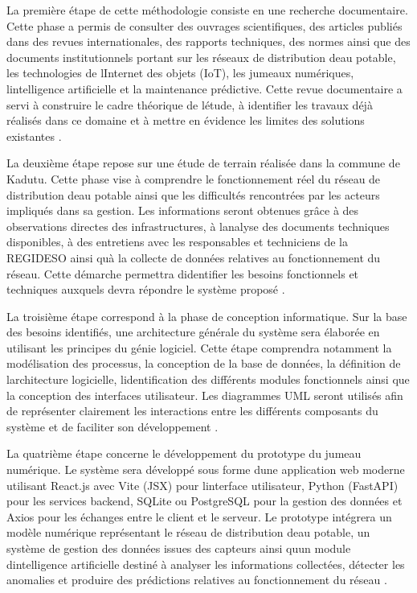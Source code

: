 \documentclass[12pt,a4paper,oneside]{report}
\begin{document}
La première étape de cette méthodologie consiste en une recherche
documentaire. Cette phase a permis de consulter des ouvrages
scientifiques, des articles publiés dans des revues internationales, des
rapports techniques, des normes ainsi que des documents institutionnels
portant sur les réseaux de distribution d\textquotesingle eau potable,
les technologies de l\textquotesingle Internet des objets (IoT), les
jumeaux numériques, l\textquotesingle intelligence artificielle et la
maintenance prédictive. Cette revue documentaire a servi à construire le
cadre théorique de l\textquotesingle étude, à identifier les travaux
déjà réalisés dans ce domaine et à mettre en évidence les limites des
solutions existantes \cite{ref104}.

La deuxième étape repose sur une étude de terrain réalisée dans la
commune de Kadutu. Cette phase vise à comprendre le fonctionnement réel
du réseau de distribution d\textquotesingle eau potable ainsi que les
difficultés rencontrées par les acteurs impliqués dans sa gestion. Les
informations seront obtenues grâce à des observations directes des
infrastructures, à l\textquotesingle analyse des documents techniques
disponibles, à des entretiens avec les responsables et techniciens de la
REGIDESO ainsi qu\textquotesingle à la collecte de données relatives au
fonctionnement du réseau. Cette démarche permettra
d\textquotesingle identifier les besoins fonctionnels et techniques
auxquels devra répondre le système proposé \cite{ref75}.

La troisième étape correspond à la phase de conception informatique. Sur
la base des besoins identifiés, une architecture générale du système
sera élaborée en utilisant les principes du génie logiciel. Cette étape
comprendra notamment la modélisation des processus, la conception de la
base de données, la définition de l\textquotesingle architecture
logicielle, l\textquotesingle identification des différents modules
fonctionnels ainsi que la conception des interfaces utilisateur. Les
diagrammes UML seront utilisés afin de représenter clairement les
interactions entre les différents composants du système et de faciliter
son développement \cite{ref105}.

La quatrième étape concerne le développement du prototype du jumeau
numérique. Le système sera développé sous forme d\textquotesingle une
application web moderne utilisant React.js avec Vite (JSX) pour
l\textquotesingle interface utilisateur, Python (FastAPI) pour les
services backend, SQLite ou PostgreSQL pour la gestion des données et
Axios pour les échanges entre le client et le serveur. Le prototype
intégrera un modèle numérique représentant le réseau de distribution
d\textquotesingle eau potable, un système de gestion des données issues
des capteurs ainsi qu\textquotesingle un module
d\textquotesingle intelligence artificielle destiné à analyser les
informations collectées, détecter les anomalies et produire des
prédictions relatives au fonctionnement du réseau \cite{ref106}.
\end{document}
